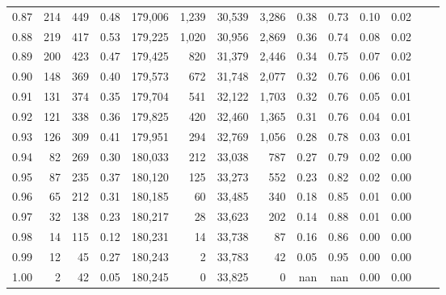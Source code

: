 \begin{tabular}{rrrrrrrrrrrrrr}
0.87 &    214 &  449 &    0.48 &  179,006 &    1,239 &  30,539 &   3,286 &  0.38 &  0.73 &  0.10 &      0.02 \\
0.88 &    219 &  417 &    0.53 &  179,225 &    1,020 &  30,956 &   2,869 &  0.36 &  0.74 &  0.08 &      0.02 \\
0.89 &    200 &  423 &    0.47 &  179,425 &      820 &  31,379 &   2,446 &  0.34 &  0.75 &  0.07 &      0.02 \\
0.90 &    148 &  369 &    0.40 &  179,573 &      672 &  31,748 &   2,077 &  0.32 &  0.76 &  0.06 &      0.01 \\
0.91 &    131 &  374 &    0.35 &  179,704 &      541 &  32,122 &   1,703 &  0.32 &  0.76 &  0.05 &      0.01 \\
0.92 &    121 &  338 &    0.36 &  179,825 &      420 &  32,460 &   1,365 &  0.31 &  0.76 &  0.04 &      0.01 \\
0.93 &    126 &  309 &    0.41 &  179,951 &      294 &  32,769 &   1,056 &  0.28 &  0.78 &  0.03 &      0.01 \\
0.94 &     82 &  269 &    0.30 &  180,033 &      212 &  33,038 &     787 &  0.27 &  0.79 &  0.02 &      0.00 \\
0.95 &     87 &  235 &    0.37 &  180,120 &      125 &  33,273 &     552 &  0.23 &  0.82 &  0.02 &      0.00 \\
0.96 &     65 &  212 &    0.31 &  180,185 &       60 &  33,485 &     340 &  0.18 &  0.85 &  0.01 &      0.00 \\
0.97 &     32 &  138 &    0.23 &  180,217 &       28 &  33,623 &     202 &  0.14 &  0.88 &  0.01 &      0.00 \\
0.98 &     14 &  115 &    0.12 &  180,231 &       14 &  33,738 &      87 &  0.16 &  0.86 &  0.00 &      0.00 \\
0.99 &     12 &   45 &    0.27 &  180,243 &        2 &  33,783 &      42 &  0.05 &  0.95 &  0.00 &      0.00 \\
1.00 &      2 &   42 &    0.05 &  180,245 &        0 &  33,825 &       0 &   nan &   nan &  0.00 &      0.00 \\
\bottomrule
\end{tabular}
